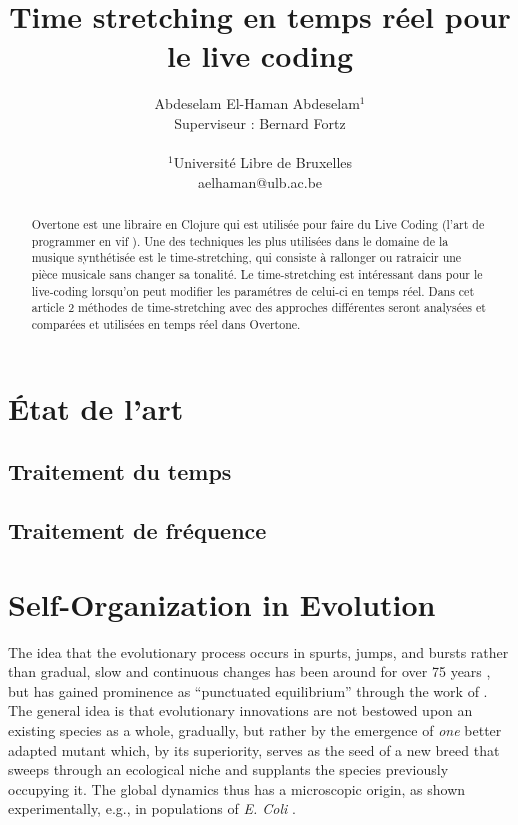 \documentclass[letterpaper]{article}
\title{Time stretching en temps réel pour le live coding}
\author{Abdeselam El-Haman Abdeselam$^{1}$\\
Superviseur : Bernard Fortz
\mbox{}\\\\
$^1$Université Libre de Bruxelles \\
aelhaman@ulb.ac.be}
\begin{document}
\maketitle

\begin{abstract}
  Overtone est une libraire en Clojure qui est utilisée pour faire du
  Live Coding (l'art de programmer en \og vif \fg{}). Une des techniques les
  plus utilisées dans le domaine de la musique synthétisée est le
  time-stretching, qui consiste à rallonger ou ratraicir une pièce musicale
  sans changer sa tonalité. Le time-stretching est intéressant dans pour
  le live-coding lorsqu'on peut modifier les paramétres de celui-ci
  en temps réel. Dans cet article 2 méthodes de time-stretching avec des
  approches différentes seront analysées et comparées et utilisées en temps
  réel dans Overtone.

\end{abstract}

\section{État de l'art}

\subsection{Traitement du temps}
\subsection{Traitement de fréquence}

\section{Self-Organization in Evolution}

The idea that the evolutionary process occurs in spurts, jumps, and
bursts rather than gradual, slow and continuous changes has been
around for over 75 years \citep{WIL}, but has gained prominence as
``punctuated equilibrium'' through the work of \citet{GE77,GE93}. The
general idea is that evolutionary innovations are not bestowed upon an
existing species as a whole, gradually, but rather by the emergence of
{\em one} better adapted mutant which, by its superiority, serves as
the seed of a new breed that sweeps through an ecological niche and
supplants the species previously occupying it. The global dynamics
thus has a microscopic origin, as shown experimentally, e.g., in
populations of {\it E. Coli} \citep{ECL96}.
\end{document}

